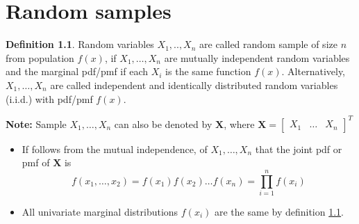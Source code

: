 \documentclass[10pt, twoside, a4paper]{book}
\theoremstyle{definition}
\newtheorem{definition}{Definition}[chapter]
\begin{document}
\chapter{Random samples}
\begin{definition}
\label{defRandomSamples1}
Random variables $X_1,..,X_n$ are called random sample of size $n$ from
population $f(x)$, if $X_1,\ldots,X_n$ are mutually independent random variables
and the marginal pdf/pmf if each $X_i$ is the same function $f(x)$.
Alternatively, $X_1,\ldots,X_n$ are called independent and identically
distributed random variables (i.i.d.) with pdf/pmf $f(x)$.
\end{definition}
\textbf{Note:} Sample $X_1,\ldots,X_n$ can also be denoted by $\bm X$, where
$\bm X = \begin{bmatrix}X_1 & \hdots & X_n \end{bmatrix}^T$
\begin{itemize}
\item If follows from the mutual independence, of $X_1,\ldots,X_n$ that the
joint pdf or pmf of $\bm X$ is
$$f(x_1,\ldots,x_2) = f(x_1)f(x_2)\ldots f(x_n) = \prod_{i=1}^n f(x_i)$$
\item All univariate marginal distributions $f(x_i)$ are the same by definition
\ref{defRandomSamples1}.
\end{itemize}
\end{document}
